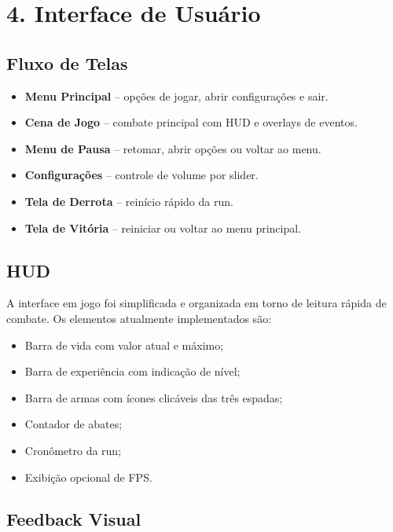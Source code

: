 \documentclass[a4paper,12pt]{article}
\begin{document}
\pagebreak


\section*{4. Interface de Usuário}

\subsection*{Fluxo de Telas}

\begin{itemize}
    \item \textbf{Menu Principal} -- opções de jogar, abrir configurações e sair.
    \item \textbf{Cena de Jogo} -- combate principal com HUD e overlays de eventos.
    \item \textbf{Menu de Pausa} -- retomar, abrir opções ou voltar ao menu.
    \item \textbf{Configurações} -- controle de volume por slider.
    \item \textbf{Tela de Derrota} -- reinício rápido da run.
    \item \textbf{Tela de Vitória} -- reiniciar ou voltar ao menu principal.
\end{itemize}

\subsection*{HUD}

A interface em jogo foi simplificada e organizada em torno de leitura rápida de combate. Os elementos atualmente implementados são:

\begin{itemize}
    \item Barra de vida com valor atual e máximo;
    \item Barra de experiência com indicação de nível;
    \item Barra de armas com ícones clicáveis das três espadas;
    \item Contador de abates;
    \item Cronômetro da run;
    \item Exibição opcional de FPS.
\end{itemize}

\subsection*{Feedback Visual}
\end{document}
